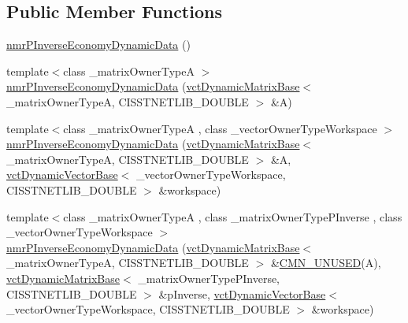 \subsection*{Public Member Functions}
\begin{DoxyCompactItemize}
\item 
\hyperlink{classnmr_p_inverse_economy_dynamic_data_a8544f64bb47204c6dd54a3ed7198c9d5}{nmr\+P\+Inverse\+Economy\+Dynamic\+Data} ()
\item 
{\footnotesize template$<$class \+\_\+matrix\+Owner\+Type\+A $>$ }\\\hyperlink{classnmr_p_inverse_economy_dynamic_data_aaed0dc0e03a151b98ae4d1c816f8c5bc}{nmr\+P\+Inverse\+Economy\+Dynamic\+Data} (\hyperlink{classvct_dynamic_matrix_base}{vct\+Dynamic\+Matrix\+Base}$<$ \+\_\+matrix\+Owner\+Type\+A, C\+I\+S\+S\+T\+N\+E\+T\+L\+I\+B\+\_\+\+D\+O\+U\+B\+L\+E $>$ \&A)
\item 
{\footnotesize template$<$class \+\_\+matrix\+Owner\+Type\+A , class \+\_\+vector\+Owner\+Type\+Workspace $>$ }\\\hyperlink{classnmr_p_inverse_economy_dynamic_data_a76e30639df6c003c388a63bfd16ce953}{nmr\+P\+Inverse\+Economy\+Dynamic\+Data} (\hyperlink{classvct_dynamic_matrix_base}{vct\+Dynamic\+Matrix\+Base}$<$ \+\_\+matrix\+Owner\+Type\+A, C\+I\+S\+S\+T\+N\+E\+T\+L\+I\+B\+\_\+\+D\+O\+U\+B\+L\+E $>$ \&A, \hyperlink{classvct_dynamic_vector_base}{vct\+Dynamic\+Vector\+Base}$<$ \+\_\+vector\+Owner\+Type\+Workspace, C\+I\+S\+S\+T\+N\+E\+T\+L\+I\+B\+\_\+\+D\+O\+U\+B\+L\+E $>$ \&workspace)
\item 
{\footnotesize template$<$class \+\_\+matrix\+Owner\+Type\+A , class \+\_\+matrix\+Owner\+Type\+P\+Inverse , class \+\_\+vector\+Owner\+Type\+Workspace $>$ }\\\hyperlink{classnmr_p_inverse_economy_dynamic_data_a645d6152dcfc45511e48b53344b96120}{nmr\+P\+Inverse\+Economy\+Dynamic\+Data} (\hyperlink{classvct_dynamic_matrix_base}{vct\+Dynamic\+Matrix\+Base}$<$ \+\_\+matrix\+Owner\+Type\+A, C\+I\+S\+S\+T\+N\+E\+T\+L\+I\+B\+\_\+\+D\+O\+U\+B\+L\+E $>$ \&\hyperlink{cmn_portability_8h_a021894e2626935fa2305434b1e893ff6}{C\+M\+N\+\_\+\+U\+N\+U\+S\+E\+D}(A), \hyperlink{classvct_dynamic_matrix_base}{vct\+Dynamic\+Matrix\+Base}$<$ \+\_\+matrix\+Owner\+Type\+P\+Inverse, C\+I\+S\+S\+T\+N\+E\+T\+L\+I\+B\+\_\+\+D\+O\+U\+B\+L\+E $>$ \&p\+Inverse, \hyperlink{classvct_dynamic_vector_base}{vct\+Dynamic\+Vector\+Base}$<$ \+\_\+vector\+Owner\+Type\+Workspace, C\+I\+S\+S\+T\+N\+E\+T\+L\+I\+B\+\_\+\+D\+O\+U\+B\+L\+E $>$ \&workspace)
\item 

\end{DoxyCompactItemize}
